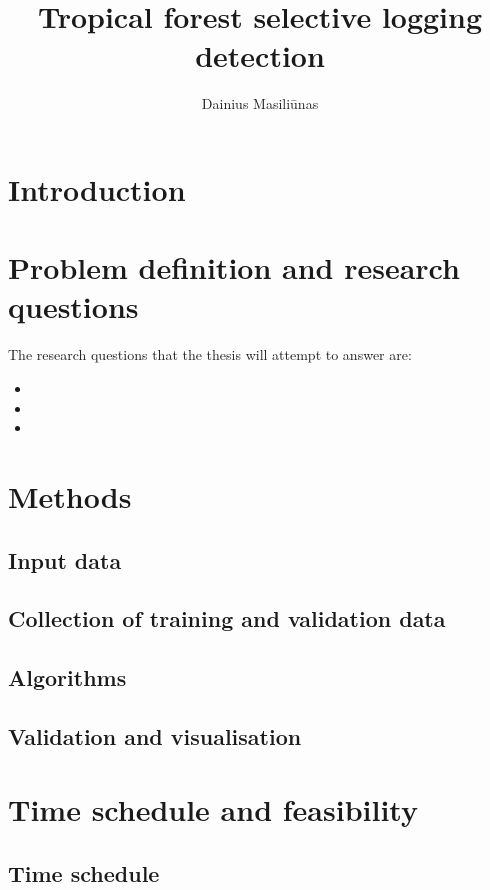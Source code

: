 \documentclass[a4paper,10pt]{article}
\title{Tropical forest selective logging detection}
\author{Dainius Masiliūnas}
\begin{document}
\maketitle

\section{Introduction}

\section{Problem definition and research questions}

The research questions that the thesis will attempt to answer are:

\begin{itemize}
 \item
 \item
 \item
\end{itemize}

\section{Methods}

\subsection{Input data}

\subsection{Collection of training and validation data}

\subsection{Algorithms}

\subsection{Validation and visualisation}

\section{Time schedule and feasibility}

\subsection{Time schedule}
\end{document}

